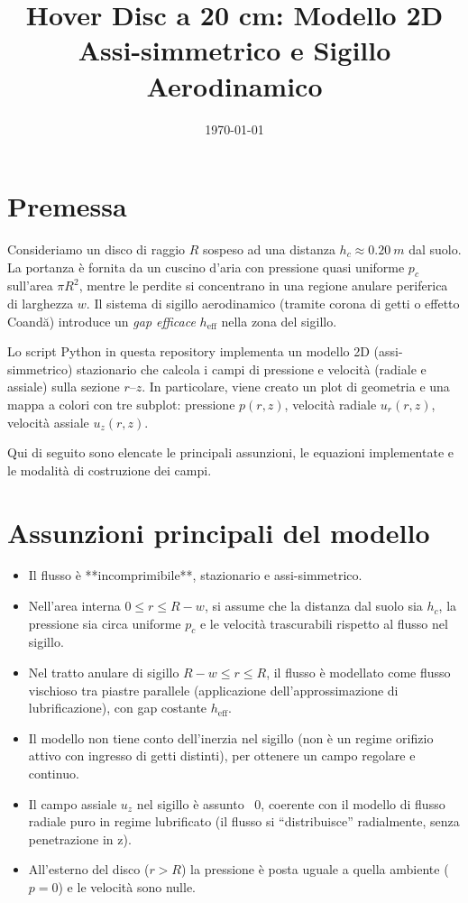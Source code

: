 \documentclass[11pt,a4paper]{article}
\title{Hover Disc a 20 cm: Modello 2D Assi-simmetrico e Sigillo Aerodinamico}
\author{}
\date{\today}
\begin{document}
\maketitle

\section{Premessa}
Consideriamo un disco di raggio \(R\) sospeso ad una distanza \(h_c \approx \SI{0.20}{m}\) dal suolo.  
La portanza è fornita da un cuscino d'aria con pressione quasi uniforme \(p_c\) sull'area \(\pi R^2\), mentre le perdite si concentrano in una regione anulare periferica di larghezza \(w\).  
Il sistema di sigillo aerodinamico (tramite corona di getti o effetto Coandă) introduce un \emph{gap efficace} \(h_{\mathrm{eff}}\) nella zona del sigillo.  

Lo script Python in questa repository implementa un modello 2D (assi-simmetrico) stazionario che calcola i campi di pressione e velocità (radiale e assiale) sulla sezione \(r\)–\(z\). In particolare, viene creato un plot di geometria e una mappa a colori con tre subplot: pressione \(p(r,z)\), velocità radiale \(u_r(r,z)\), velocità assiale \(u_z(r,z)\).

Qui di seguito sono elencate le principali assunzioni, le equazioni implementate e le modalità di costruzione dei campi.

\section{Assunzioni principali del modello}
\begin{itemize}
  \item Il flusso è **incomprimibile**, stazionario e assi-simmetrico.
  \item Nell'area interna \(0 \le r \le R - w\), si assume che la distanza dal suolo sia \(h_c\), la pressione sia circa uniforme \(p_c\) e le velocità trascurabili rispetto al flusso nel sigillo.
  \item Nel tratto anulare di sigillo \(R - w \le r \le R\), il flusso è modellato come flusso vischioso tra piastre parallele (applicazione dell'approssimazione di lubrificazione), con gap costante \(h_{\mathrm{eff}}\).
  \item Il modello non tiene conto dell'inerzia nel sigillo (non è un regime orifizio attivo con ingresso di getti distinti), per ottenere un campo regolare e continuo.
  \item Il campo assiale \(u_z\) nel sigillo è assunto ~0, coerente con il modello di flusso radiale puro in regime lubrificato (il flusso si “distribuisce” radialmente, senza penetrazione in z).
  \item All'esterno del disco (\(r > R\)) la pressione è posta uguale a quella ambiente (\(p=0\)) e le velocità sono nulle.
\end{itemize}
\end{document}
